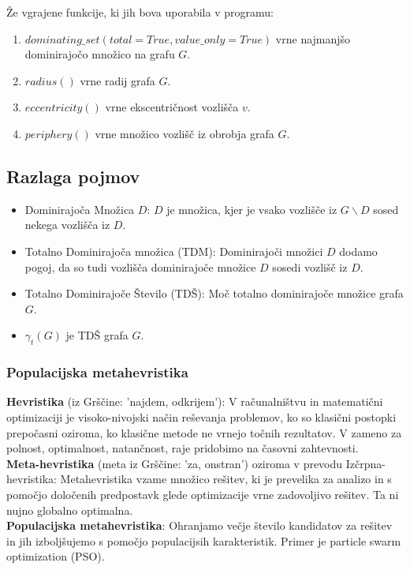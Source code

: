 \documentclass[10pt, a4paper]{article}
\begin{document}
Že vgrajene funkcije, ki jih bova uporabila v programu:
\begin{enumerate}
	\item $dominating\_ set(total=True, value\_ only=True)$ vrne najmanjšo dominirajočo množico na grafu $G$.
	\item $radius()$ vrne radij grafa $G$.
	\item $eccentricity()$ vrne ekscentričnost vozlišča $v$.
	\item $periphery()$ vrne množico vozlišč iz obrobja grafa $G$.
\end{enumerate}

\subsection{Razlaga pojmov}
\begin{itemize}
\item Dominirajoča Množica $D$: $D$ je množica, kjer je vsako vozlišče iz $G \backslash D$ sosed nekega vozlišča iz $D$.
\item Totalno Dominirajoča množica (TDM): Dominirajoči množici $D$ dodamo pogoj, da so tudi vozlišča dominirajoče množice 
$D$ sosedi vozlišč iz $D$.
\item Totalno Dominirajoče Število (TDŠ): Moč totalno dominirajoče množice grafa $G$.
\item $\gamma_{t}(G)$ je TDŠ grafa $G$.
\end{itemize}

\subsubsection{Populacijska metahevristika}
\textbf{Hevristika} (iz Grščine: 'najdem, odkrijem'): V računalništvu in matematični optimizaciji je visoko-nivojski način reševanja problemov, ko so klasični postopki prepočasni oziroma, ko klasične metode ne vrnejo točnih rezultatov. V zameno za polnost, optimalnost, natančnost, raje pridobimo na časovni zahtevnosti. \\
\textbf{Meta-hevristika} (meta iz Grščine: 'za, onstran') oziroma v prevodu Izčrpna-hevristika: Metahevristika vzame množico rešitev, ki je prevelika za analizo in s pomočjo določenih predpostavk glede optimizacije vrne zadovoljivo rešitev. Ta ni nujno globalno optimalna. \\
\textbf{Populacijska metahevristika}: Ohranjamo večje število kandidatov za rešitev in jih izboljšujemo s pomočjo populacijsih karakteristik. Primer je particle swarm optimization (PSO).
\end{document}
